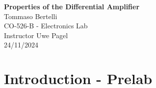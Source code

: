 \documentclass{article}
\begin{document}
	
	\mbox{}
	\vspace{10cm}
	\begin{center}
		\textbf{\Huge{Properties of the Differential Amplifier}}\\
		\bigskip
		\Large{Tommaso Bertelli}\\
		\bigskip
		\Large{CO-526-B - Electronics Lab}\\
		\bigskip
		\Large{Instructor Uwe Pagel}\\
		\bigskip
		\Large{24/11/2024}\\
	\end{center}
	\pagebreak
	
	\section{Introduction - Prelab}
\end{document}
